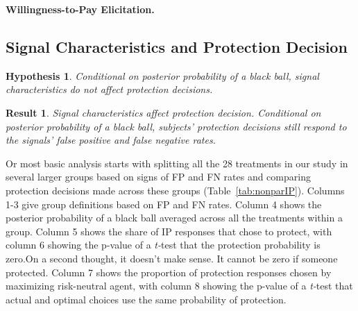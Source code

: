 \documentclass[12pt,a4paper]{article}
\newcommand{\aut}[1]{{\color{Red}#1}}
\newtheorem{hypothesis}{Hypothesis}
\newtheorem{result}{Result}
\begin{document}
\begin{figure}[H]
	\hfill
	\hfill
\end{figure}
\clearpage


\bigskip\noindent\textbf{Willingness-to-Pay Elicitation.}\ \ \ 


\subsection{Signal Characteristics and Protection Decision}

\begin{hypothesis} Conditional on posterior probability of a black ball, signal characteristics do not affect protection decisions. \end{hypothesis}
\begin{result}\label{res:IPdeviations} Signal characteristics affect protection decision. Conditional on posterior probability of a black ball, subjects' protection decisions still respond to the signals' false positive and false negative rates. \end{result}

Or most basic analysis starts with splitting all the 28 treatments in our study in several larger groups based on signs of FP and FN rates and comparing protection decisions made across these groups (Table~\ref{tab:nonparIP}). Columns 1-3 give group definitions based on FP and FN rates. Column 4 shows the posterior probability of a black ball averaged across all the treatments within a group. Column 5 shows the share of IP responses that chose to protect, with column 6 showing the p-value of a \emph{t-}test that the protection probability is zero.\aut{On a second thought, it doesn't make sense. It cannot be zero if someone protected.} Column 7 shows the proportion of protection responses chosen by maximizing risk-neutral agent, with column 8 showing the p-value of a \emph{t-}test that actual and optimal choices use the same probability of protection.
\end{document}
